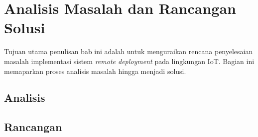 \chapter{Analisis Masalah dan Rancangan Solusi}

Tujuan utama penulisan bab ini adalah untuk menguraikan rencana penyelesaian masalah implementasi sistem \textit{remote deployment} pada lingkungan IoT. Bagian ini memaparkan proses analisis masalah hingga menjadi solusi.


\section{Analisis}

% 

% 

% 

\section{Rancangan}

% 

% 

% 
